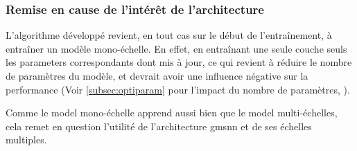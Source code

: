 
\subsubsection{Remise en cause de l'intérêt de l'architecture}

L'algorithme développé revient, en tout cas sur le début de l'entraînement, à entraîner un modèle mono-échelle.
En effet, en entraînant une seule couche seuls les \glspl{parameter} correspondants dont mis à jour, ce qui revient à réduire le nombre de paramètres du modèle, et devrait avoir une influence négative sur la performance (Voir \autoref{subsec:optiparam} pour l'impact du nombre de paramètres, ).

Comme le \gls{model} mono-échelle apprend aussi bien que le \gls{model} multi-échelles, cela remet en question l'utilité de l'architecture \gls{gmsnn} et de ses échelles multiples.
